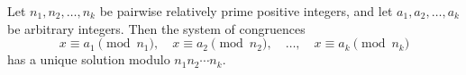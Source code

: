 Let $n_1, n_2, \ldots, n_k$ be pairwise relatively prime positive integers, and let $a_1, a_2, \ldots, a_k$ be arbitrary integers. Then the system of congruences
$$x \equiv a_1 \pmod{n_1}, \quad x \equiv a_2 \pmod{n_2}, \quad \ldots, \quad x \equiv a_k \pmod{n_k}$$
has a unique solution modulo $n_1 n_2 \cdots n_k$.
